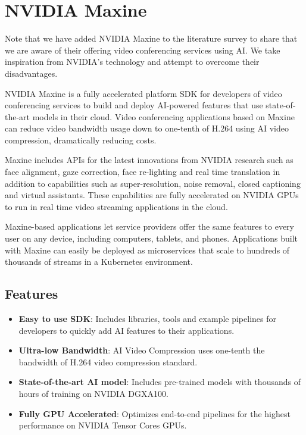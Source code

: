 \section{NVIDIA Maxine}

Note that we have added NVIDIA Maxine to the literature survey to share that we are aware of 
their offering video conferencing services using AI. We take 
inspiration from NVIDIA's technology and attempt to overcome their disadvantages.

NVIDIA Maxine is a fully accelerated platform SDK for developers of video 
conferencing services to build and deploy AI-powered features that use state-of-the-art 
models in their cloud. Video conferencing applications based on Maxine can reduce video 
bandwidth usage down to one-tenth of H.264 using AI video compression, dramatically reducing costs.

Maxine includes APIs for the latest innovations from NVIDIA research such as face alignment, 
gaze correction, face re-lighting and real time translation in addition to capabilities such 
as super-resolution, noise removal, closed captioning and virtual assistants. These capabilities are 
fully accelerated on NVIDIA GPUs to run in real time video streaming applications in the cloud.

Maxine-based applications let service providers offer the same features to every user on any device,
including computers, tablets, and phones. Applications built with Maxine can easily be deployed as 
microservices that scale to hundreds of thousands of streams in a Kubernetes environment.~\cite{Maxine}

\subsection{Features}

\begin{itemize}
    \item \textbf{Easy to use SDK}: Includes libraries, tools and example pipelines 
    for developers to quickly add AI features to their applications.
    \item \textbf{Ultra-low Bandwidth}: AI Video Compression uses one-tenth the 
    bandwidth of H.264 video compression standard.
    \item \textbf{State-of-the-art AI model}: Includes pre-trained models with thousands of hours 
    of training on NVIDIA DGX\texttrademark A100.
    \item \textbf{Fully GPU Accelerated}: Optimizes end-to-end pipelines for the highest performance 
    on NVIDIA Tensor Cores GPUs.
\end{itemize}

